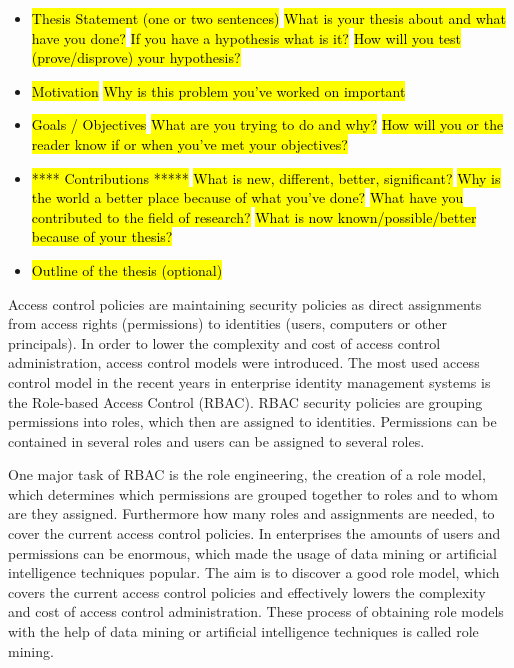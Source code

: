     \begin{itemize}
        \item \hl{Thesis Statement (one or two sentences)}
            \subitem \hl{What is your thesis about and what have you done?}
            \subitem \hl{If you have a hypothesis what is it?}
            \subitem \hl{How will you test (prove/disprove) your hypothesis?}
        \item \hl{Motivation}
            \subitem \hl{Why is this problem you've worked on important}
        \item \hl{Goals / Objectives}
            \subitem \hl{What are you trying to do and why?}
            \subitem \hl{How will you or the reader know if or when you've met your objectives?}
        \item \hl{**** Contributions *****}
            \subitem \hl{What is new, different, better, significant?}
            \subitem \hl{Why is the world a better place because of what you've done?}
            \subitem \hl{What have you contributed to the field of research?}
            \subitem \hl{What is now known/possible/better because of your thesis?}
        \item \hl{Outline of the thesis (optional)}
    \end{itemize}
\fi
Access control policies are maintaining security policies as direct assignments from access rights (permissions) to identities (users, computers or other principals). In order to lower the complexity and cost of access control administration, access control models were introduced. The most used access control model in the recent years in enterprise identity management systems is the Role-based Access Control (RBAC)\cite{Kunz}. RBAC security policies are grouping permissions into roles, which then are assigned to identities. Permissions can be contained in several roles and users can be assigned to several roles.

One major task of RBAC is the role engineering, the creation of a role model, which determines which permissions are grouped together to roles and to whom are they assigned. Furthermore how many roles and assignments are needed, to cover the current access control policies. In enterprises the amounts of users and permissions can be enormous, which made the usage of data mining or artificial intelligence techniques popular. The aim is to discover a good role model, which covers the current access control policies and effectively lowers the complexity and cost of access control administration. These process of obtaining role models with the help of data mining or artificial intelligence techniques is called role mining.

